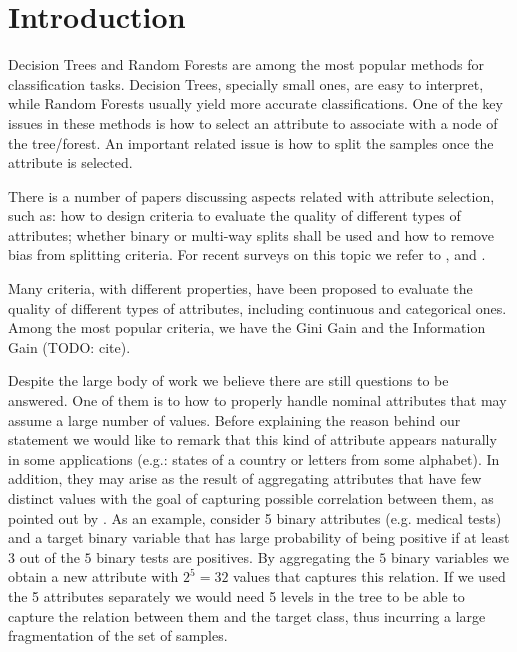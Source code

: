 \newpage

\chapter{Introduction}
\label{chap:introduction}

Decision Trees and Random Forests are among the most popular 
methods for classification tasks. Decision Trees, specially small ones, are easy to interpret,
while Random Forests usually yield more accurate classifications. One of the key issues in these methods
is how to select an attribute to associate with a node of the tree/forest. An important
related issue is how to split the samples once the attribute is selected.

There is a number of papers  discussing aspects related with 
attribute selection, such as:
how to design criteria to evaluate the quality of different types of attributes;
whether binary or multi-way splits shall be used and
how to remove bias from  splitting criteria.
For recent surveys on this topic we refer to \cite{books/sp/datamining2005/RokachM05},
\cite{Loh2014} and \cite{series/sbcs/BarrosCF15}.

Many criteria, with different properties,  have been proposed to evaluate 
the quality of different types of attributes, including
continuous and categorical ones.  Among the most popular criteria,
we have the Gini Gain and the Information Gain \cite{} (TODO: cite).

Despite the large body of work we believe  there are still questions to be answered.
One of them is to how to  properly handle nominal  attributes that may assume a large number of values.
Before explaining the reason behind our  statement we would
like to remark that this kind of attribute
appears naturally in some applications  (e.g.: states of a country or letters from some alphabet).
In addition, they may arise as the result of aggregating
attributes that have few distinct values
with the goal of capturing possible correlation between them, as pointed out by \cite{Chou:91}.
As an example, consider 5 binary attributes (e.g. medical tests) and a
target binary variable  that has large probability of being positive if at least $3$ out
of the $5$ binary tests are positives. By aggregating
the $5$ binary variables we obtain a new attribute with $2^5=32$
values that  captures  this relation. 
If we used the 5 attributes separately we would 
need 5 levels in the tree to be able to capture the relation between
them and the target class, thus 
incurring a large fragmentation of the set of samples.

